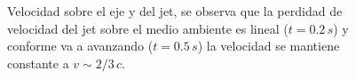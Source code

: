 \documentclass[12pt,a4paper]{book}
\begin{document}
\begin{figure}
\centering
{}
\caption{\label{fig:jet_ma_alto_densidad_vel}Velocidad sobre el eje y del jet, se observa que la perdidad de velocidad del jet sobre el medio ambiente es lineal ($t = 0.2 \,s$) y conforme va a avanzando ($t = 0.5 \, s$) la velocidad se mantiene constante a $v\sim 2/3 \, c$.}
\end{figure}
\end{document}
